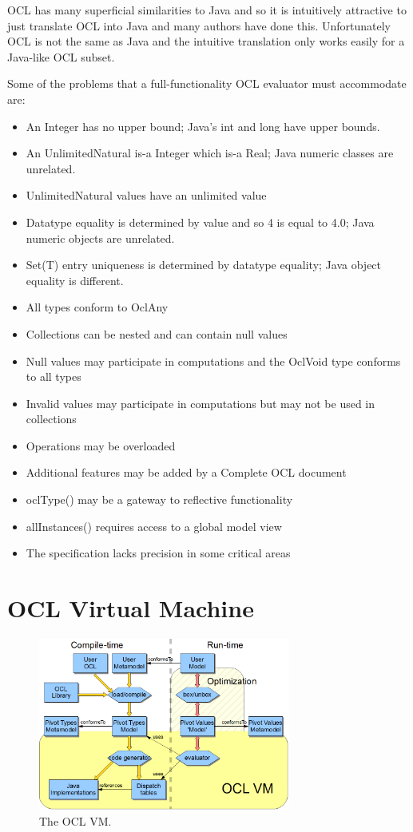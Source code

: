 \documentclass{sig-alternate}
\begin{document}
OCL has many superficial similarities to Java and so it is intuitively attractive to just translate OCL into Java and many authors have done this. Unfortunately OCL is not the same as Java and the intuitive translation only works easily for a Java-like OCL subset.

Some of the problems that a full-functionality OCL evaluator must accommodate are:
\begin{itemize}
\item An Integer has no upper bound; Java's int and long have upper bounds.
\item An UnlimitedNatural is-a Integer which is-a Real; Java numeric classes are unrelated.
\item UnlimitedNatural values have an unlimited value
\item Datatype equality is determined by value and so 4 is equal to 4.0; Java numeric objects are unrelated.
\item Set(T) entry uniqueness is determined by datatype equality; Java object equality is different.
\item All types conform to OclAny
\item Collections can be nested and can contain null values
\item Null values may participate in computations and the OclVoid type conforms to all types
\item Invalid values may participate in computations but may not be used in collections
\item Operations may be overloaded
\item Additional features may be added by a Complete OCL document
\item oclType() may be a gateway to reflective functionality
\item allInstances() requires access to a global model view 
\item The specification lacks precision in some critical areas
\end{itemize}

\section{OCL Virtual Machine}\label{VM now}

\begin{figure}
  \begin{center}
    \includegraphics[width=3.25in]{OCL2012OCLVM.png}
  \end{center}
  \caption{The OCL VM.}
  \label{fig:OCLVM}
\end{figure}
\end{document}
